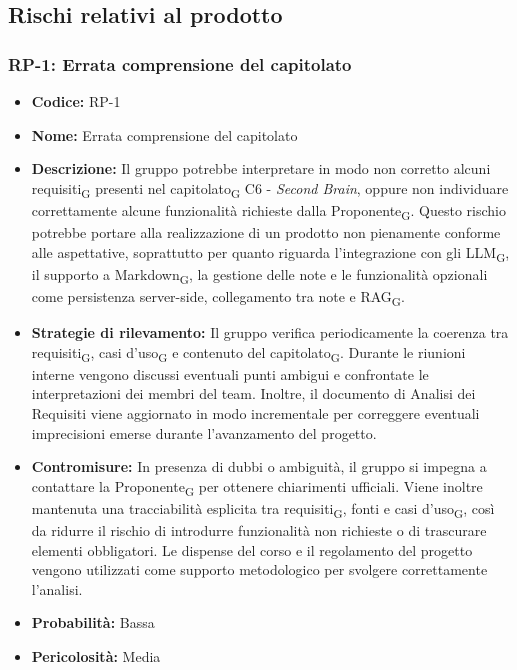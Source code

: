 \documentclass[a4paper, 10pt, colorlinks=true, linkcolor=black, urlcolor=blue, citecolor=blue, hidelinks]{article}
\begin{document}
\subsection{Rischi relativi al prodotto}

\subsubsection{RP-1: Errata comprensione del capitolato}

\begin{itemize}
    \item \textbf{Codice:} RP-1

    \item \textbf{Nome:} Errata comprensione del capitolato

    \item \textbf{Descrizione:} Il gruppo potrebbe interpretare in modo non corretto alcuni requisiti\textsubscript{G} presenti nel capitolato\textsubscript{G} C6 - \textit{Second Brain}, oppure non individuare correttamente alcune funzionalità richieste dalla Proponente\textsubscript{G}. Questo rischio potrebbe portare alla realizzazione di un prodotto non pienamente conforme alle aspettative, soprattutto per quanto riguarda l'integrazione con gli LLM\textsubscript{G}, il supporto a Markdown\textsubscript{G}, la gestione delle note e le funzionalità opzionali come persistenza server-side, collegamento tra note e RAG\textsubscript{G}.

    \item \textbf{Strategie di rilevamento:} Il gruppo verifica periodicamente la coerenza tra requisiti\textsubscript{G}, casi d'uso\textsubscript{G} e contenuto del capitolato\textsubscript{G}. Durante le riunioni interne vengono discussi eventuali punti ambigui e confrontate le interpretazioni dei membri del team. Inoltre, il documento di Analisi dei Requisiti viene aggiornato in modo incrementale per correggere eventuali imprecisioni emerse durante l'avanzamento del progetto.

    \item \textbf{Contromisure:} In presenza di dubbi o ambiguità, il gruppo si impegna a contattare la Proponente\textsubscript{G} per ottenere chiarimenti ufficiali. Viene inoltre mantenuta una tracciabilità esplicita tra requisiti\textsubscript{G}, fonti e casi d'uso\textsubscript{G}, così da ridurre il rischio di introdurre funzionalità non richieste o di trascurare elementi obbligatori. Le dispense del corso e il regolamento del progetto vengono utilizzati come supporto metodologico per svolgere correttamente l'analisi.

    \item \textbf{Probabilità:} Bassa

    \item \textbf{Pericolosità:} Media
\end{itemize}
\end{document}
